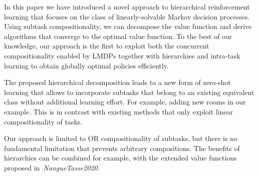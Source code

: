 In this paper we have introduced a novel approach to hierarchical reinforcement learning that focuses on the class of linearly-solvable Markov decision processes.
Using subtask compositionality, we can decompose the value function and derive algorithms that converge to the optimal value function.
To the best of our knowledge, our approach is the first to exploit both the concurrent compositionality enabled by LMDPs together with hierarchies and intra-task learning to obtain globally optimal policies efficiently.

The proposed hierarchical decomposition leads to a new form of zero-shot learning that allows to incorporate subtasks that belong to an existing equivalent class without additional learning effort.
For example, adding new rooms in our example.
This is in contrast with existing methods that only exploit linear compositionality of tasks.

Our approach is limited to OR compositionality of subtasks, but there is no fundamental limitation that prevents arbitrary compositions.
The benefits of hierarchies can be combined for example, with the extended value functions proposed in~\textit{NangueTasse2020}.
